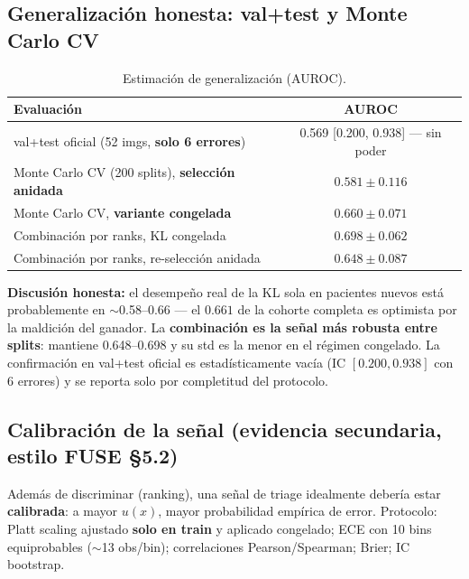 \documentclass[12pt,a4paper]{article}
\newcommand{\ux}{u(x)}
\begin{document}
\subsection{Generalización honesta: val+test y Monte Carlo CV}
\label{sec:generalizacion}

\begin{table}[H]
\centering
\small
\caption{Estimación de generalización (AUROC).}
\label{tab:generalizacion}
\begin{tabular}{lc}
\toprule
\textbf{Evaluación} & \textbf{AUROC} \\
\midrule
val+test oficial (52 imgs, \textbf{solo 6 errores}) & 0.569 [0.200, 0.938] --- sin poder \\
Monte Carlo CV (200 splits), \textbf{selección anidada} & $0.581 \pm 0.116$ \\
Monte Carlo CV, \textbf{variante congelada} & $0.660 \pm 0.071$ \\
Combinación por ranks, KL congelada & $0.698 \pm 0.062$ \\
Combinación por ranks, re-selección anidada & $0.648 \pm 0.087$ \\
\bottomrule
\end{tabular}
\end{table}

\textbf{Discusión honesta:} el desempeño real de la KL sola en pacientes
nuevos está probablemente en $\sim$0.58--0.66 --- el $0.661$ de la cohorte
completa es optimista por la maldición del ganador. La \textbf{combinación
es la señal más robusta entre splits}: mantiene 0.648--0.698 y su std es
la menor en el régimen congelado. La confirmación en val+test oficial es
estadísticamente vacía (IC $[0.200, 0.938]$ con 6 errores) y se reporta
solo por completitud del protocolo.

\subsection{Calibración de la señal (evidencia secundaria, estilo FUSE §5.2)}
\label{sec:calibracion}

Además de discriminar (ranking), una señal de triage idealmente debería
estar \textbf{calibrada}: a mayor $\ux$, mayor probabilidad empírica de
error. Protocolo: Platt scaling ajustado \textbf{solo en train} y aplicado
congelado; ECE con 10 bins equiprobables ($\sim$13 obs/bin); correlaciones
Pearson/Spearman; Brier; IC bootstrap.
\end{document}
